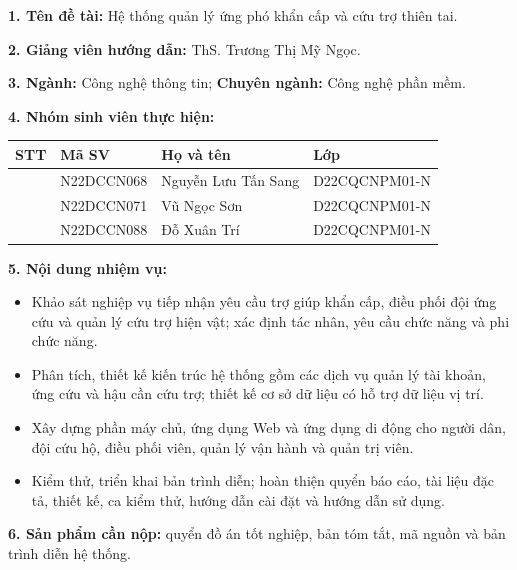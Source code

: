 \documentclass[12pt,a4paper,oneside]{report}
\newcommand{\projecttitle}{Hệ thống quản lý ứng phó khẩn cấp và cứu trợ thiên tai}
\newcommand{\advisorname}{ThS. Trương Thị Mỹ Ngọc}
\begin{document}
{\setlength{\parskip}{3pt}
\noindent\textbf{1. Tên đề tài:} \projecttitle.\par
\noindent\textbf{2. Giảng viên hướng dẫn:} \advisorname.\par
\noindent\textbf{3. Ngành:} Công nghệ thông tin; \textbf{Chuyên ngành:} Công nghệ phần mềm.\par
\noindent\textbf{4. Nhóm sinh viên thực hiện:}\par
\vspace{2pt}
{\small\noindent\begin{tabularx}{\textwidth}{|>{\centering\arraybackslash}p{1.0cm}|>{\centering\arraybackslash}p{3.2cm}|Y|>{\centering\arraybackslash}p{3.8cm}|}
  \hline
  \textbf{STT} & \textbf{Mã SV} & \centering\arraybackslash\textbf{Họ và tên} & \textbf{Lớp} \\
   & N22DCCN068 & Nguyễn Lưu Tấn Sang & D22CQCNPM01-N \\
   & N22DCCN071 & Vũ Ngọc Sơn & D22CQCNPM01-N \\
   & N22DCCN088 & Đỗ Xuân Trí & D22CQCNPM01-N \\
  \hline
\end{tabularx}\par}
\vspace{2pt}
\noindent\textbf{5. Nội dung nhiệm vụ:}
\begin{itemize}\setlength{\itemsep}{0pt}\setlength{\parskip}{0pt}
  \item Khảo sát nghiệp vụ tiếp nhận yêu cầu trợ giúp khẩn cấp, điều phối đội ứng cứu và quản lý cứu trợ hiện vật; xác định tác nhân, yêu cầu chức năng và phi chức năng.
  \item Phân tích, thiết kế kiến trúc hệ thống gồm các dịch vụ quản lý tài khoản, ứng cứu và hậu cần cứu trợ; thiết kế cơ sở dữ liệu có hỗ trợ dữ liệu vị trí.
  \item Xây dựng phần máy chủ, ứng dụng Web và ứng dụng di động cho người dân, đội cứu hộ, điều phối viên, quản lý vận hành và quản trị viên.
  \item Kiểm thử, triển khai bản trình diễn; hoàn thiện quyển báo cáo, tài liệu đặc tả, thiết kế, ca kiểm thử, hướng dẫn cài đặt và hướng dẫn sử dụng.
\end{itemize}
\noindent\textbf{6. Sản phẩm cần nộp:} quyển đồ án tốt nghiệp, bản tóm tắt, mã nguồn và bản trình diễn hệ thống.\par
}
\vspace{0.5cm}
\end{document}
